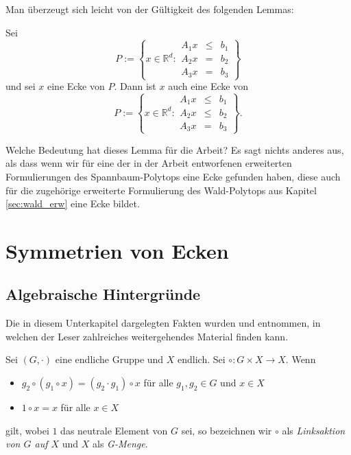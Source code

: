 \documentclass[10p,a4paper,BCOR = 12mm, DIV=15]{scrbook}
\begin{document}
{Man überzeugt sich leicht von der Gültigkeit des folgenden Lemmas:
\begin{Le}
Sei
\begin{displaymath}
P := \left\{x \in \mathbb{R}^d: 
\begin{array}{ccc}
A_1 x & \leq & b_1 \\
A_2 x & = & b_2 \\
A_3 x & = & b_3
\end{array}
\right\}
\end{displaymath}
und sei $x$ eine Ecke von $P$. Dann ist $x$ auch eine Ecke von
\begin{displaymath}
P := \left\{x \in \mathbb{R}^d: 
\begin{array}{ccc}
A_1 x & \leq & b_1 \\
A_2 x & \leq & b_2 \\
A_3 x & = & b_3
\end{array}
\right\}.
\end{displaymath}
\end{Le}

Welche Bedeutung hat dieses Lemma für die Arbeit? Es sagt nichts anderes aus, als dass wenn wir für eine der in der Arbeit entworfenen erweiterten Formulierungen des Spannbaum-Polytops eine Ecke gefunden haben, diese auch für die zugehörige erweiterte Formulierung des Wald-Polytops aus Kapitel \ref{sec:wald_erw} eine Ecke bildet.

\section{Symmetrien von Ecken}

\subsection{Algebraische Hintergründe}

Die in diesem Unterkapitel dargelegten Fakten wurden \cite{bosch2006algebra} und \cite{huppert1998character} entnommen, in welchen der Leser zahlreiches weitergehendes Material finden kann.

\begin{Def}
Sei $\left(G, \cdot\right)$ eine endliche Gruppe und $X$ endlich. Sei $\circ: G \times X \rightarrow X$. Wenn
\begin{itemize}
\item $g_2 \circ \left(g_1 \circ x\right) = \left(g_2 \cdot g_1\right) \circ x$ für alle $g_1, g_2 \in G$ und $x \in X$
\item $1 \circ x = x$ für alle $x \in X$
\end{itemize}
gilt, wobei $1$ das neutrale Element von $G$ sei, so bezeichnen wir $\circ$ als \emph{Linksaktion von $G$ auf $X$} und $X$ als \emph{G-Menge}.
\end{Def}

}
\end{document}
